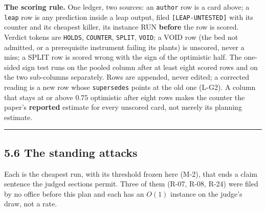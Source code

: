 \documentclass[11pt,a4paper]{article}
\theoremstyle{plain}
\theoremstyle{definition}
\theoremstyle{remark}
\begin{document}
\textbf{The scoring rule.} One ledger, two sources: an \texttt{author}
row is a card above; a \texttt{leap} row is any prediction inside a leap
output, filed \texttt{{[}LEAP-UNTESTED{]}} with its counter and its
cheapest killer, its instance RUN \textbf{before} the row is scored.
Verdict tokens are \texttt{HOLDS}, \texttt{COUNTER}, \texttt{SPLIT},
\texttt{VOID}; a VOID row (the bed not admitted, or a prerequisite
instrument failing its plants) is unscored, never a miss; a SPLIT row is
scored wrong with the sign of the optimistic half. The one-sided sign
test runs on the pooled column after at least eight scored rows and on
the two sub-columns separately. Rows are appended, never edited; a
corrected reading is a new row whose \texttt{supersedes} points at the
old one (L-G2). A column that stays at or above \(0.75\) optimistic
after eight rows makes the counter the paper's \textbf{reported}
estimate for every unscored card, not merely its planning estimate.

\begin{center}\rule{0.5\linewidth}{0.5pt}\end{center}

\subsection{5.6 The standing attacks}\label{the-standing-attacks}

Each is the cheapest run, with its threshold frozen here (M-2), that
ends a claim sentence the judged sections permit. Three of them (R-07,
R-08, R-24) were filed by no office before this plan and each has an
\(O(1)\) instance on the judge's draw, not a rate.
\end{document}
